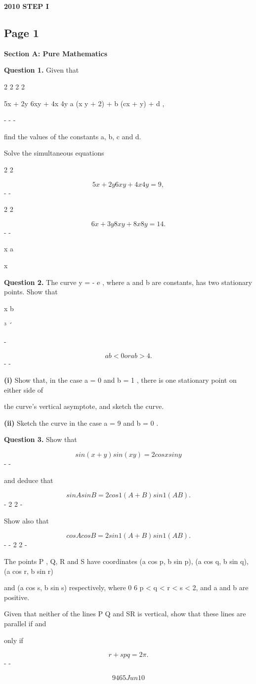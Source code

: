 \documentclass[12pt]{article}
\begin{document}
\begin{center}
{\Large \textbf{2010 STEP I}}
\end{center}

\subsection*{Page 1}
\begin{flushleft}
\bigskip\textbf{Section A: Pure Mathematics}\par
\bigskip\textbf{Question 1.} Given that\par
2 2 2 2\par
5x + 2y 6xy + 4x 4y a (x y + 2) + b (cx + y) + d ,\par
- - \equiv -\par
find the values of the constants a, b, c and d.\par
Solve the simultaneous equations\par
2 2\par
\[5x + 2y 6xy + 4x 4y = 9 ,\]
- -\par
2 2\par
\[6x + 3y 8xy + 8x 8y = 14 .\]
- -\par
x a\par
x\par
\bigskip\textbf{Question 2.} The curve y = - e , where a and b are constants, has two stationary points. Show that\par
x b\par
³ ´\par
-\par
\[a b < 0 or a b > 4 .\]
- -\par
\textbf{(i)} Show that, in the case a = 0 and b = 1 , there is one stationary point on either side of\par
the curve's vertical asymptote, and sketch the curve.\par
\textbf{(ii)} Sketch the curve in the case a = 9 and b = 0 .\par
\bigskip\textbf{Question 3.} Show that\par
\[sin(x + y) sin(x y) = 2 cos x sin y\]
- -\par
and deduce that\par
\[sin A sin B = 2 cos 1 (A + B) sin 1 (A B) .\]
- 2 2 -\par
Show also that\par
\[cos A cos B = 2 sin 1 (A + B) sin 1 (A B) .\]
- - 2 2 -\par
The points P , Q, R and S have coordinates (a cos p, b sin p), (a cos q, b sin q), (a cos r, b sin r)\par
and (a cos s, b sin s) respectively, where 0 6 p < q < r < s < 2\pi, and a and b are positive.\par
Given that neither of the lines P Q and SR is vertical, show that these lines are parallel if and\par
only if\par
\[r + s p q = 2\pi .\]
- -\par
\[9465 Jun10\]
\end{flushleft}
\end{document}
